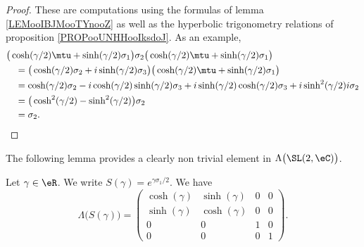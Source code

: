 \begin{proof}
	These are computations using the formulas of lemma \eqref{LEMooIBJMooTYnooZ} as well as the hyperbolic trigonometry relations of proposition \ref{PROPooUNHHooIksdoJ}. As an example,
	\begin{subequations}
		\begin{align}
			 & \big( \cosh(\gamma/2)\mtu+\sinh(\gamma/2)\sigma_1 \big)\sigma_2\big( \cosh(\gamma/2)\mtu+\sinh(\gamma/2)\sigma_1 \big)                    \\
			 & \quad=
			\big( \cosh(\gamma/2)\sigma_2+i\sinh(\gamma/2)\sigma_3 \big)\big( \cosh(\gamma/2)\mtu+\sinh(\gamma/2)\sigma_1 \big)                          \\
			 & \quad=\cosh(\gamma/2)\sigma_2-i\cosh(\gamma/2)\sinh(\gamma/2)\sigma_3+i\sinh(\gamma/2)\cosh(\gamma/2)\sigma_3+i\sinh^2(\gamma/2)i\sigma_2 \\
			 & \quad=\big( \cosh^2(\gamma/2)-\sinh^2(\gamma/2) \big)\sigma_2                                                                             \\
			 & \quad=\sigma_2.
		\end{align}
	\end{subequations}
\end{proof}

The following lemma provides a clearly non trivial element in \( \Lambda\big( \SL(2,\eC) \big)\).
\begin{lemma}     \label{LEMooGURFooRTBBmi}
	Let \( \gamma\in \eR\). We write \( S(\gamma)= e^{\gamma\sigma_1/2}\). We have
	\begin{equation}
		\Lambda\big( S(\gamma) \big)=\begin{pmatrix}
			\cosh(\gamma) & \sinh(\gamma) & 0 & 0 \\
			\sinh(\gamma) & \cosh(\gamma) & 0 & 0 \\
			0             & 0             & 1 & 0 \\
			0             & 0             & 0 & 1
		\end{pmatrix}.
	\end{equation}
\end{lemma}

